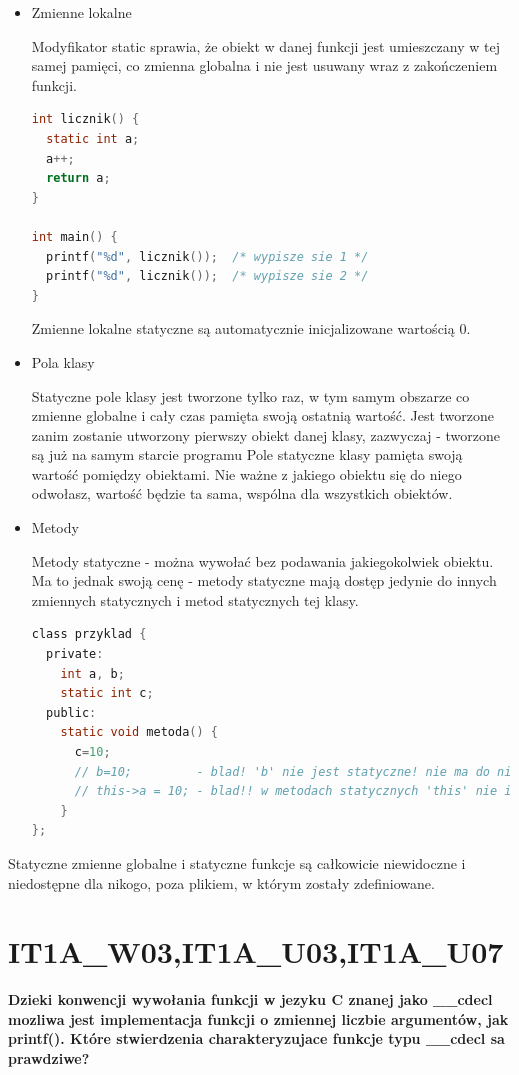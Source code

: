 \begin{itemize}
\item Zmienne lokalne

Modyfikator static sprawia, że obiekt w danej funkcji jest umieszczany w tej samej pamięci, co zmienna globalna i nie jest usuwany wraz z zakończeniem funkcji.
\begin{lstlisting}[language=c]
int licznik() {
  static int a;
  a++;
  return a;
}

int main() {
  printf("%d", licznik());  /* wypisze sie 1 */
  printf("%d", licznik());  /* wypisze sie 2 */ 
}
\end{lstlisting}

Zmienne lokalne statyczne są automatycznie inicjalizowane wartością 0.

\item Pola klasy

Statyczne pole klasy jest tworzone tylko raz, w tym samym obszarze co zmienne globalne i cały czas pamięta swoją ostatnią wartość. Jest tworzone zanim zostanie utworzony pierwszy obiekt danej klasy, zazwyczaj - tworzone są już na samym starcie programu
Pole statyczne klasy pamięta swoją wartość pomiędzy obiektami. Nie ważne z jakiego obiektu się do niego odwołasz, wartość będzie ta sama, wspólna dla wszystkich obiektów.

\item Metody

Metody statyczne - można wywołać bez podawania jakiegokolwiek obiektu. Ma to jednak swoją cenę - metody statyczne mają dostęp jedynie do innych zmiennych statycznych i metod statycznych tej klasy. 

\begin{lstlisting}[language=c]
class przyklad {
  private:
    int a, b;
    static int c;
  public:
    static void metoda() {
      c=10; 
      // b=10;         - blad! 'b' nie jest statyczne! nie ma do niego dostepu
      // this->a = 10; - blad!! w metodach statycznych 'this' nie istnieje!!
    }
};
\end{lstlisting}
\end{itemize}

Statyczne zmienne globalne i statyczne funkcje są całkowicie niewidoczne i niedostępne dla nikogo, poza plikiem, w którym zostały zdefiniowane.

\section{IT1A\_W03,IT1A\_U03,IT1A\_U07} 
\textbf{Dzieki konwencji wywołania funkcji w jezyku C znanej jako \_\_cdecl mozliwa jest implementacja funkcji o zmiennej liczbie argumentów, jak printf(). Które stwierdzenia charakteryzujace funkcje typu \_\_cdecl sa prawdziwe?}

